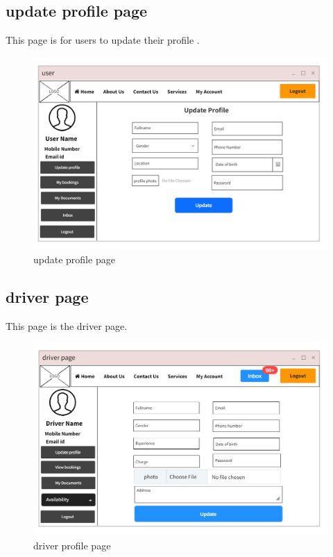 \documentclass[a4paper,12pt,toc=flat]{report}
\begin{document}
	\pagebreak
	
		\subsection{update profile page}
\hspace*{12pt}
        This page is for users to update their profile .
	\begin{figure}[bph]
	\begin{center}
		\includegraphics[width=1.1 \linewidth, height=0.7\textheight]{"user_update.png"}
	\end{center}
		\caption{ update profile page}
	\end{figure}

	\pagebreak
	
	
		\subsection{driver page}
\hspace*{12pt}
        This page is the driver page.
	\begin{figure}[bph]
	\begin{center}
		\includegraphics[width=1.1 \linewidth, height=0.7\textheight]{"driver_update.png"}
	\end{center}
		\caption{ driver profile page}
	\end{figure}
\end{document}
